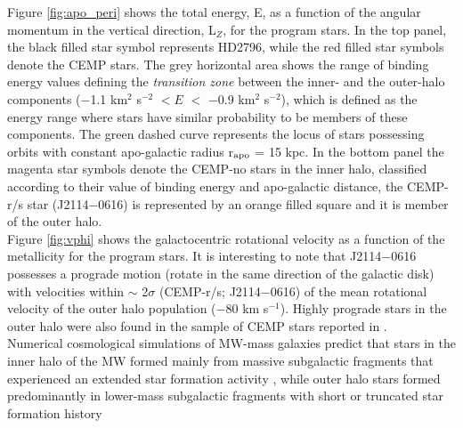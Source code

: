 Figure \ref{fig:apo_peri} shows the total energy, E, as a function of the angular momentum in the vertical direction, L$_{Z}$, for the program stars.  In the top panel, the black filled star symbol represents HD2796, while the red filled star symbols denote the CEMP stars. The grey horizontal area shows the range of binding energy values defining the {\it transition zone} between the inner- and the outer-halo components ($-$1.1 km$^{2}$ s$^{-2}$ $ < E$ $<$ $-$0.9 km$^{2}$ s$^{-2}$), which is defined as the energy range where stars have similar probability to be members of these components. The green dashed curve represents the locus of stars possessing orbits with constant apo-galactic radius r$_{\rm apo}$ = 15 kpc. In the bottom panel the magenta star symbols denote the CEMP-no stars in the inner halo, classified according to their value of binding energy and apo-galactic distance, the CEMP-r/s star (J2114$-$0616) is represented by an orange filled square and it is member of the outer halo. \\
Figure \ref{fig:vphi} shows the galactocentric rotational velocity as a function of the metallicity for the program stars. It is interesting to note that J2114$-$0616 possesses a prograde motion (rotate in the same direction of the galactic disk) with velocities within $\sim$ 2$\sigma$ (CEMP-r/s; J2114$-$0616) of the mean rotational velocity of the outer halo population ($-$80 km s$^{-1}$). Highly prograde stars in the outer halo were also found in the sample of CEMP stars reported in \citet[; Figure 4]{2014ApJ...788..180C}.\\
Numerical cosmological simulations of MW-mass galaxies predict that stars in the inner halo of the MW formed mainly from massive subgalactic fragments that experienced an extended star formation activity \citep{2009ApJ...702.1058Z, 2011MNRAS.416.2802F, 2012MNRAS.420.2245M, 2013MNRAS.432.3391T, 2014MNRAS.439.3128T}, while outer halo stars formed predominantly in lower-mass subgalactic fragments with short or truncated star formation history 
